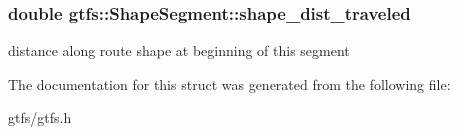 \subsubsection[{\texorpdfstring{shape\+\_\+dist\+\_\+traveled}{shape_dist_traveled}}]{\setlength{\rightskip}{0pt plus 5cm}double gtfs\+::\+Shape\+Segment\+::shape\+\_\+dist\+\_\+traveled}\hypertarget{structgtfs_1_1ShapeSegment_a64afdd03235b9bc256fc18652c6f9c47}{}\label{structgtfs_1_1ShapeSegment_a64afdd03235b9bc256fc18652c6f9c47}
distance along route shape at beginning of this segment 

The documentation for this struct was generated from the following file\+:\begin{DoxyCompactItemize}
\item 
gtfs/gtfs.\+h\end{DoxyCompactItemize}
